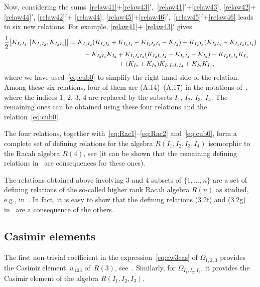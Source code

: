 \documentclass[10pt,a4paper]{amsart}
\numberwithin{equation}{section}
\theoremstyle{definition}
\begin{document}
Now, considering the sums~\eqref{relaw41}+\eqref{relaw43}$'$,~\eqref{relaw41}$'$+\eqref{relaw43}, \eqref{relaw42}+\eqref{relaw44}$'$,
\eqref{relaw42}$'$+ \eqref{relaw44},
\eqref{relaw45}+\eqref{relaw46}$'$,~\eqref{relaw45}$'$+\eqref{relaw46} leads to six new relations.
For example, \eqref{relaw41}+ \eqref{relaw43}$'$ gives
 \begin{gather*}%
\frac12\big[K_{I_3I_4} , [K_{I_1I_2},K_{I_2I_3}]\big] =
K_{I_1I_2}(K_{I_2I_3}+K_{I_3I_4}-K_{I_2I_3I_4}-K_{I_3}) +K_{I_2I_3}(K_{I_3I_4}-K_{I_1I_2I_3I_4})
\\
\hphantom{\frac12\big[K_{I_3I_4} , [K_{I_1I_2},K_{I_2I_3}]\big] =}{}-K_{I_3I_4} K_{I_2}
+K_{I_1I_2I_3}(K_{I_2I_3I_4}-K_{I_3I_4}-K_{I_2})-K_{I_2I_3I_4} K_{I_3}
\\
\hphantom{\frac12\big[K_{I_3I_4} , [K_{I_1I_2},K_{I_2I_3}]\big] =}{}
+(K_{I_2}+K_{I_3}) K_{I_1I_2I_3I_4}+K_{I_2} K_{I_3} ,
\end{gather*}
where we have used~\eqref{eq:cub0} to simplify the right-hand side of the relation.
Among these six relations, four of them
are (A.14)--(A.17) in the notations of~\cite{CFR}, where the indices $1$, $2$, $3$, $4$ are replaced by the subsets $I_1$, $I_2$, $I_3$, $I_4$. The remaining ones can be obtained using these four relations and the relation~\eqref{eq:cub0}.

The four relations, together with~\eqref{eq:Rac1}--\eqref{eq:Rac2} and~\eqref{eq:cub0}, form a complete set of defining relations for the algebra $R(I_1,I_2,I_3,I_4)$ isomorphic to the Racah algebra $R(4)$, see \cite[Appendix~A]{CFR} (it can be shown that the remaining defining relations
in~\cite[Appendix~A]{CFR} are consequences for these ones).

The relations obtained above involving 3 and 4 subsets of $\{1,\dots,n\}$ are a set of defining relations of the so-called higher rank Racah algebra $R(n)$ as studied, e.g., in~\cite{CGPV}. In fact, it is easy to show that the defining relations (3.2f) and (3.2g) in~\cite{CGPV} are a consequence of the others.

\subsection{Casimir elements}
The first non-trivial coefficient in the expression~\eqref{eq:aw3cas} of $\varOmega_{1,2,3}$ provides the Casimir element~$w_{123}$ of~$R(3)$, see~\cite{avatar}.
Similarly, for $\varOmega_{I_1,I_2,I_3}$, it provides the Casimir element of the algebra $R(I_1,I_2,I_3)$.
\end{document}
